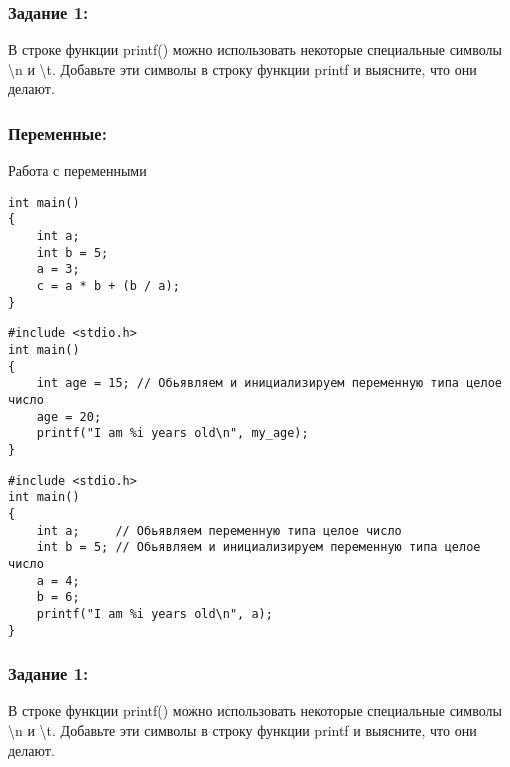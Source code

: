 \documentclass{article}
\begin{document}
\subsubsection*{Задание 1:}
В строке функции printf() можно использовать некоторые специальные символы \textbackslash n и \textbackslash t. Добавьте эти символы в строку функции printf и выясните, что они делают.

\subsubsection*{Переменные:}
Работа с переменными
\begin{lstlisting}
int main() 
{
    int a;
    int b = 5;
    a = 3;
    c = a * b + (b / a);
}
\end{lstlisting}


\begin{lstlisting}
#include <stdio.h>
int main() 
{
    int age = 15; // Обьявляем и инициализируем переменную типа целое число
    age = 20;
    printf("I am %i years old\n", my_age);
}
\end{lstlisting}

\begin{lstlisting}
#include <stdio.h>
int main() 
{
    int a;     // Обьявляем переменную типа целое число
    int b = 5; // Обьявляем и инициализируем переменную типа целое число
    a = 4;
    b = 6;
    printf("I am %i years old\n", a);
}
\end{lstlisting}

\subsubsection*{Задание 1:}
В строке функции printf() можно использовать некоторые специальные символы \textbackslash n и \textbackslash t. Добавьте эти символы в строку функции printf и выясните, что они делают.
\end{document}
